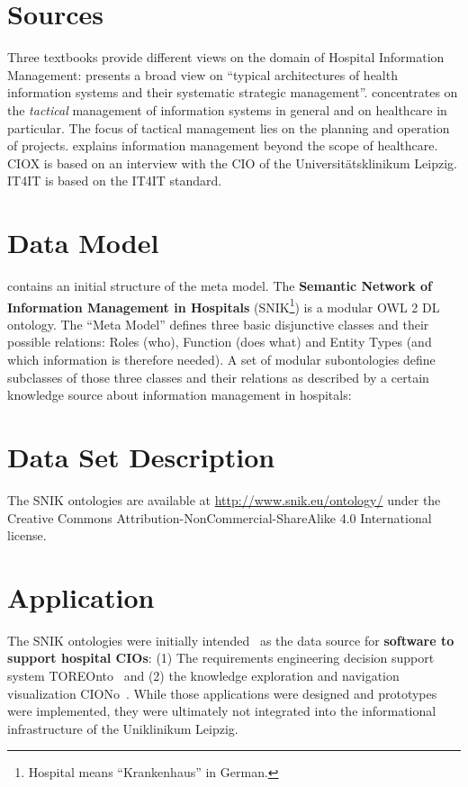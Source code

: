 \documentclass[sw]{iosart2x}
\renewcommand{\citet}{\cite}%
\renewcommand{\citep}{\cite}%
\begin{document}
\section{Sources}\label{sec:sources}
Three textbooks provide different views on the domain of Hospital Information Management:
\citet{bb} presents a broad view on \enquote{typical architectures of health information systems and their systematic strategic management}.
\citep{ob} concentrates on the \emph{tactical} management of information systems in general and on healthcare in particular.
The focus of tactical management lies on the planning and operation of projects.  
\citet{he} explains information management beyond the scope of healthcare. 
CIOX is based on an interview with the CIO of the Universitätsklinikum Leipzig.
IT4IT is based on the IT4IT standard.

\section{Data Model}\label{sec:architecture}
\citet{domaene} contains an initial structure of the meta model.
The \textbf{Semantic Network of Information Management in Hospitals} (SNIK\footnote{Hospital means \enquote{Krankenhaus} in German.}) is a modular OWL 2 DL ontology.
The \enquote{Meta Model} defines three basic disjunctive classes and their possible relations: Roles (who), Function (does what) and Entity Types (and which information is therefore needed).
A set of modular subontologies define subclasses of those three classes and their relations as described by a certain knowledge source about information management in hospitals:

\section{Data Set Description}\label{sec:dsd}
The SNIK ontologies are available at \url{http://www.snik.eu/ontology/} under the Creative Commons Attribution-NonCommercial-ShareAlike 4.0 International license.

\section{Application}\label{sec:application}
The SNIK ontologies were initially intended~\citep{domaene} as the data source for \textbf{software to support hospital CIOs}:
(1) The requirements engineering decision support system TOREOnto~\citep{toreonto} and (2) the knowledge exploration and navigation visualization CIONo~\citep{ciono}.
While those applications were designed and prototypes were implemented, they were ultimately not integrated into the informational infrastructure of the Uniklinikum Leipzig.
\end{document}
